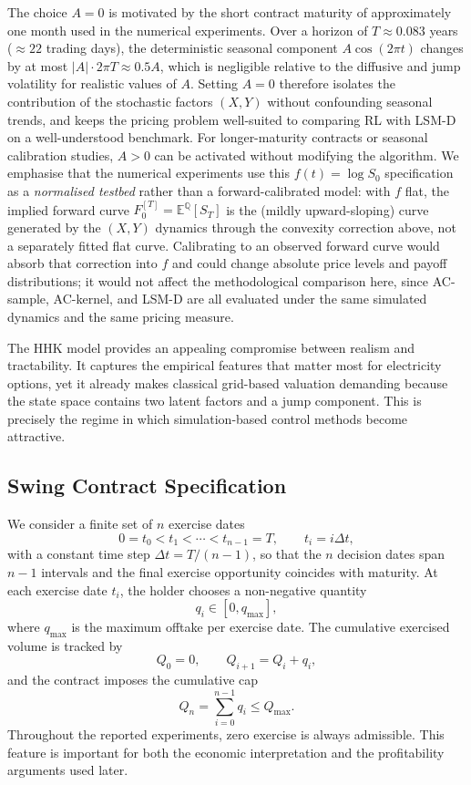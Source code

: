 \documentclass[a4paper,fleqn]{cas-dc}
\begin{document}
The choice $A = 0$ is motivated by the short contract maturity of approximately one month used in the numerical experiments.
Over a horizon of $T \approx 0.083$ years ($\approx 22$ trading days), the deterministic seasonal component $A\cos(2\pi t)$ changes by at most $|A|\cdot 2\pi T \approx 0.5A$, which is negligible relative to the diffusive and jump volatility for realistic values of $A$.
Setting $A = 0$ therefore isolates the contribution of the stochastic factors $(X,Y)$ without confounding seasonal trends, and keeps the pricing problem well-suited to comparing RL with LSM-D on a well-understood benchmark.
For longer-maturity contracts or seasonal calibration studies, $A > 0$ can be activated without modifying the algorithm.
We emphasise that the numerical experiments use this $f(t)=\log S_0$ specification as a \emph{normalised testbed} rather than a forward-calibrated model: with $f$ flat, the implied forward curve $F_0^{[T]}=\mathbb{E}^{\mathbb{Q}}[S_T]$ is the (mildly upward-sloping) curve generated by the $(X,Y)$ dynamics through the convexity correction above, not a separately fitted flat curve. Calibrating to an observed forward curve would absorb that correction into $f$ and could change absolute price levels and payoff distributions; it would not affect the methodological comparison here, since AC-sample, AC-kernel, and LSM-D are all evaluated under the same simulated dynamics and the same pricing measure.

The HHK model provides an appealing compromise between realism and tractability. It captures the empirical features that matter most for electricity options, yet it already makes classical grid-based valuation demanding because the state space contains two latent factors and a jump component. This is precisely the regime in which simulation-based control methods become attractive.

\subsection{Swing Contract Specification}

We consider a finite set of $n$ exercise dates
\[
    0 = t_0 < t_1 < \cdots < t_{n-1} = T,
    \qquad
    t_i = i \Delta t,
\]
with a constant time step $\Delta t = T/(n-1)$, so that the $n$ decision dates span $n-1$ intervals and the final exercise opportunity coincides with maturity. At each exercise date $t_i$, the holder chooses a non-negative quantity
\[
    q_i \in [0,q_{\max}],
\]
where $q_{\max}$ is the maximum offtake per exercise date. The cumulative exercised volume is tracked by
\[
    Q_0 = 0,
    \qquad
    Q_{i+1} = Q_i + q_i,
\]
and the contract imposes the cumulative cap
\[
    Q_n = \sum_{i=0}^{n-1} q_i \le Q_{\max}.
\]
Throughout the reported experiments, zero exercise is always admissible. This feature is important for both the economic interpretation and the profitability arguments used later.
\end{document}
